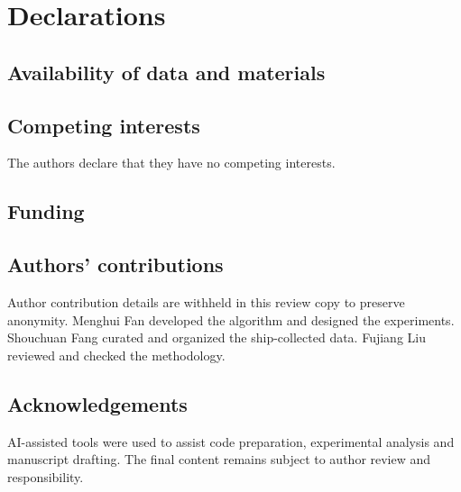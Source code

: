 \documentclass[12pt,a4paper]{article}
\begin{document}
\section*{Declarations}
\subsection*{Availability of data and materials}

\subsection*{Competing interests}
The authors declare that they have no competing interests.
\subsection*{Funding}
\mbox{}
\subsection*{Authors' contributions}
\ifdefined\BlindReview
Author contribution details are withheld in this review copy to preserve anonymity.
\else
Menghui Fan developed the algorithm and designed the experiments. Shouchuan Fang curated and organized the ship-collected data. Fujiang Liu reviewed and checked the methodology.
\fi
\subsection*{Acknowledgements}
AI-assisted tools were used to assist code preparation, experimental analysis and manuscript drafting. The final content remains subject to author review and responsibility.

\appendix
\end{document}
